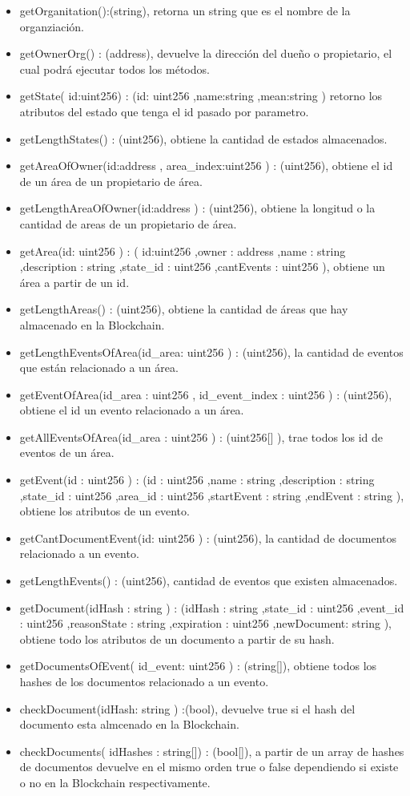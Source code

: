     \begin{itemize}
      \item getOrganitation():(string), retorna un string que es el nombre de la organziación.
      \item getOwnerOrg() : (address), devuelve la dirección del dueño o propietario, el cual podrá ejecutar todos los métodos.
      \item getState( id:uint256) : (id: uint256 ,name:string ,mean:string ) retorno los atributos del estado que tenga el id pasado por parametro.
      \item getLengthStates() : (uint256), obtiene la cantidad de estados almacenados.
      \item getAreaOfOwner(id:address , area\_index:uint256 ) : (uint256), obtiene el id de un área de un propietario de área.
      \item getLengthAreaOfOwner(id:address ) : (uint256), obtiene la longitud o la cantidad de areas de un propietario de área.
      \item getArea(id: uint256 ) : ( id:uint256 ,owner : address ,name : string ,description : string ,state\_id : uint256 ,cantEvents : uint256 ), obtiene un área a partir de un id.
      \item getLengthAreas() : (uint256), obtiene la cantidad de áreas que hay almacenado en la Blockchain.
      \item getLengthEventsOfArea(id\_area: uint256 ) : (uint256), la cantidad de eventos que están relacionado a un área.
      \item getEventOfArea(id\_area : uint256 , id\_event\_index : uint256 )  : (uint256), obtiene el id un evento relacionado a un área.
      \item getAllEventsOfArea(id\_area : uint256 )  : (uint256[] ), trae todos los id de eventos de un área.
      \item getEvent(id : uint256 ) : (id : uint256 ,name : string  ,description : string ,state\_id : uint256 ,area\_id : uint256 ,startEvent : string ,endEvent : string ), obtiene los atributos de un evento.
      \item getCantDocumentEvent(id: uint256 ) : (uint256),   la cantidad de documentos relacionado a un evento.
      \item getLengthEvents() : (uint256), cantidad de eventos que existen almacenados.
      \item getDocument(idHash : string ) : (idHash : string ,state\_id : uint256 ,event\_id : uint256 ,reasonState : string ,expiration : uint256 ,newDocument: string ), obtiene todo los atributos de un documento a partir de su hash.
      \item getDocumentsOfEvent( id\_event: uint256 ) : (string[]), obtiene todos los hashes de los documentos relacionado a un evento.
      \item checkDocument(idHash: string ) :(bool), devuelve true si el hash del documento esta almcenado en la Blockchain.
      \item checkDocuments( idHashes : string[]) : (bool[]), a partir de un array de hashes de documentos devuelve en el mismo orden true o false dependiendo si existe o no en la Blockchain
      respectivamente.
    \end{itemize}

